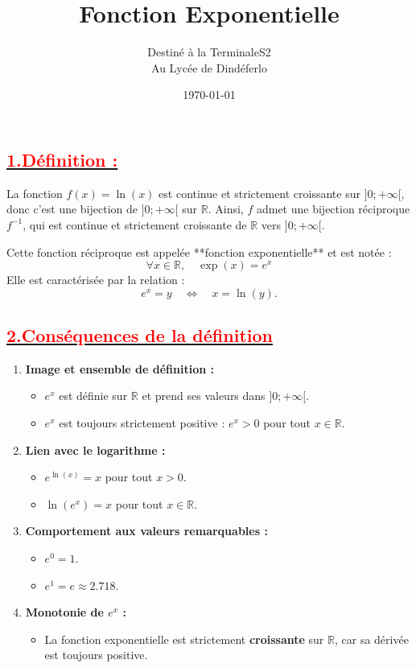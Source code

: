 \documentclass[12pt]{article}
\author{Destiné à la TerminaleS2\\Au Lycée de Dindéferlo}
\title{\textbf{Fonction Exponentielle}}
\date{\today}
\begin{document}
\maketitle
\newpage
\subsection*{\underline{\textbf{\textcolor{red}{1.Définition :}}}}
La fonction \( f(x) = \ln(x) \) est continue et strictement croissante sur \( ]0; +\infty[ \), donc c'est une bijection de \( ]0; +\infty[ \) sur \( \mathbb{R} \). Ainsi, \( f \) admet une bijection réciproque \( f^{-1} \), qui est continue et strictement croissante de \( \mathbb{R} \) vers \( ]0; +\infty[ \). 

Cette fonction réciproque est appelée **fonction exponentielle** et est notée :
\[
\forall x \in \mathbb{R}, \quad \exp(x) = e^x
\]
Elle est caractérisée par la relation :
\[
e^x = y \quad \Leftrightarrow \quad x = \ln(y).
\]
\subsection*{\underline{\textbf{\textcolor{red}{2.Conséquences de la définition}}}}

\begin{enumerate}[label=(\alph*)]
    \item \textbf{Image et ensemble de définition :}
    \begin{itemize}
        \item \( e^x \) est définie sur \( \mathbb{R} \) et prend ses valeurs dans \( ]0; +\infty[ \).
        \item \( e^x \) est toujours strictement positive : \( e^x > 0 \) pour tout \( x \in \mathbb{R} \).
    \end{itemize}

    \item \textbf{Lien avec le logarithme :}
    \begin{itemize}
        \item \( e^{\ln(x)} = x \) pour tout \( x > 0 \).
        \item \( \ln(e^x) = x \) pour tout \( x \in \mathbb{R} \).
    \end{itemize}

    \item \textbf{Comportement aux valeurs remarquables :}
    \begin{itemize}
        \item \( e^0 = 1 \).
        \item \( e^1 = e \approx 2.718 \).
    \end{itemize}

    \item \textbf{Monotonie de \( e^x \) :}
    \begin{itemize}
        \item La fonction exponentielle est strictement \textbf{croissante} sur \( \mathbb{R} \), car sa dérivée est toujours positive.
    \end{itemize}
\end{enumerate}
\end{document}
